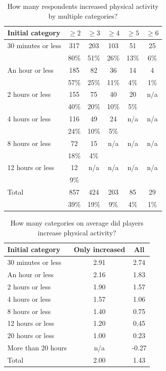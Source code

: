 \begin{table}[h]
	\centering
	\caption{How many respondents increased physical activity by multiple categories?}
	\label{tbl:physical-activity-increased-multiple-categories}
	\begin{tabular}{|l|c|c|c|c|c|}
		\hline
		\textbf{Initial category} & \textbf{\( \geq2 \)} & \textbf{\( \geq3 \)} & \textbf{\( \geq4 \)}	& \textbf{\( \geq5 \)} & \textbf{\( \geq6 \)}\\
		\hline\hline
		30 minutes or less	& 317	& 203	& 103	& 51	& 25\\
							& 80\%	& 51\%	& 26\%	& 13\%	& 6\%\\\hline
		An hour or less		& 185	& 82	& 36	& 14	& 4\\
							& 57\%	& 25\%	& 11\%	& 4\%	& 1\%\\\hline
		2 hours or less		& 155	& 75	& 40	& 20	& n/a\\
							& 40\%	& 20\%	& 10\%	& 5\%	&\\\hline
		4 hours or less		& 116	& 49	& 24	& n/a	& n/a\\
							& 24\%	& 10\%	& 5\%	&		&\\\hline
		8 hours or less		& 72	& 15	& n/a	& n/a	& n/a\\
							& 18\%	& 4\%	& 		&		&\\\hline
		12 hours or less	& 12	& n/a	& n/a	& n/a	& n/a\\
							& 9\%	& 		&		&		&\\\hline
		\hline
		Total				& 857	& 424	& 203	& 85	& 29\\
							& 39\%	& 19\%	& 9\%	& 4\%	& 1\%\\\hline
	\end{tabular}
\end{table}

\begin{table}[h]
	\centering
	\caption{How many categories on average did players increase physical activity?}
	\label{tbl:physical-activity-average-categories-increased}
	\begin{tabular}{|l|c|c|}
		\hline
		\textbf{Initial category} & \textbf{Only increased} & \textbf{All}\\
		\hline\hline
		30 minutes or less	& 2.91	& 2.74\\
		An hour or less		& 2.16	& 1.83\\
		2 hours or less		& 1.90	& 1.57\\
		4 hours or less		& 1.57	& 1.06\\
		8 hours or less		& 1.40	& 0.75\\
		12 hours or less	& 1.20	& 0.45\\
		20 hours or less	& 1.00	& 0.23\\
		More than 20 hours	& n/a	& -0.27\\
		\hline
		Total				& 2.00	& 1.43\\\hline
	\end{tabular}
\end{table}

